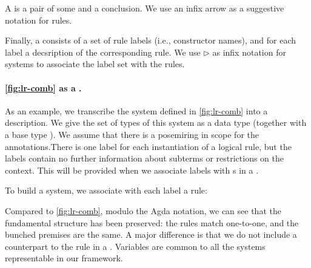 
A  is a pair of some  and a
conclusion. We use an infix arrow as a suggestive notation for rules.


Finally, a  consists of a set of rule labels (i.e.,
constructor names), and for each label a decsription of the
corresponding rule. We use $\rhd$ as infix notation for systems to
associate the label set with the rules.


\paragraph{\cref{fig:lr-comb} as a .}

As an example, we transcribe the system defined in
\cref{fig:lr-comb} into a description.  We give the set of types of
this system as a data type  (together with a base
type \AgdaInductiveConstructor{$\iota$}). We assume that there is a
posemiring  in scope for the
annotations.There is one label for each instantiation of a logical
rule, but the labels contain no further information about subterms or
restrictions on the context. This will be provided when we associate
labels with s in a .

\noindent
\begin{minipage}[t]{0.5\textwidth}
\end{minipage}
\begin{minipage}[t]{0.5\textwidth}
\end{minipage}

To build a system, we associate with each label a rule:


Compared to \cref{fig:lr-comb}, modulo the Agda notation, we can see
that the fundamental structure has been preserved: the rules match
one-to-one, and the bunched premises are the same. A major difference
is that we do not include a counterpart to the
 rule in a
. Variables are common to all the systems
representable in our framework.

